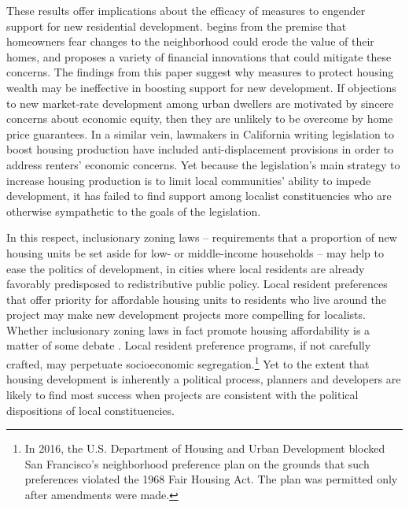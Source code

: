 \documentclass[article,12pt]{memoir}
\begin{document}
These results offer implications about the efficacy of measures to engender support for new residential development.  \citet{fischel_why_2001} begins from the premise that homeowners fear changes to the neighborhood could erode the value of their homes, and proposes a variety of financial innovations that could mitigate these concerns. The findings from this paper suggest why measures to protect housing wealth may be ineffective in boosting support for new development. If objections to new market-rate development among urban dwellers are motivated by sincere concerns about economic equity, then they are unlikely to be overcome by home price guarantees. In a similar vein, lawmakers in California writing legislation to boost housing production have included anti-displacement provisions in order to address renters' economic concerns. Yet because the legislation's main strategy to increase housing production is to limit local communities' ability to impede development, it has failed to find support among localist constituencies who are otherwise sympathetic to the goals of the legislation.

In this respect, inclusionary zoning laws -- requirements that a proportion of new housing units be set aside for low- or middle-income households -- may help to ease the politics of development, in cities where local residents are already favorably predisposed to redistributive public policy. Local resident preferences that offer priority for affordable housing units to residents who live around the project may make new development projects more compelling for localists. Whether inclusionary zoning laws in fact promote housing affordability is a matter of some debate \citep[p. 82]{glaeser_rethinking_2008}. Local resident preference programs, if not carefully crafted, may perpetuate socioeconomic segregation.\footnote{In 2016, the U.S. Department of Housing and Urban Development blocked San Francisco's neighborhood preference plan on the grounds that such preferences violated the 1968 Fair Housing Act. The plan was permitted only after amendments were made.} Yet to the extent that housing development is inherently a political process, planners and developers are likely to find most success when projects are consistent with the political dispositions of local constituencies.
\end{document}

